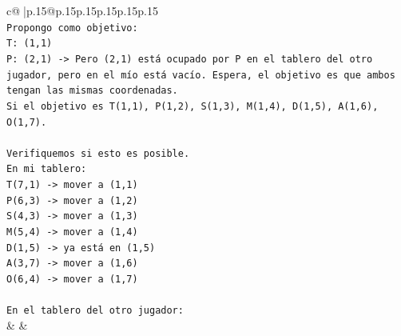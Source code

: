 \documentclass{article}
\begin{document}
{\begin{supertabular}{c@{$\;$}|p{.15\linewidth}@{}p{.15\linewidth}p{.15\linewidth}p{.15\linewidth}p{.15\linewidth}p{.15\linewidth}}
{{{\\ 
\texttt{Propongo como objetivo:} \\
\texttt{T: (1,1)} \\
\texttt{P: (2,1) {-}> Pero (2,1) está ocupado por P en el tablero del otro jugador, pero en el mío está vacío. Espera, el objetivo es que ambos tengan las mismas coordenadas.} \\
\texttt{Si el objetivo es T(1,1), P(1,2), S(1,3), M(1,4), D(1,5), A(1,6), O(1,7).} \\
\\ 
\texttt{Verifiquemos si esto es posible.} \\
\texttt{En mi tablero:} \\
\texttt{T(7,1) {-}> mover a (1,1)} \\
\texttt{P(6,3) {-}> mover a (1,2)} \\
\texttt{S(4,3) {-}> mover a (1,3)} \\
\texttt{M(5,4) {-}> mover a (1,4)} \\
\texttt{D(1,5) {-}> ya está en (1,5)} \\
\texttt{A(3,7) {-}> mover a (1,6)} \\
\texttt{O(6,4) {-}> mover a (1,7)} \\
\\ 
\texttt{En el tablero del otro jugador:} \\
            }
        }
    }
    & & \\ \\


\end{supertabular}}
\end{document}
